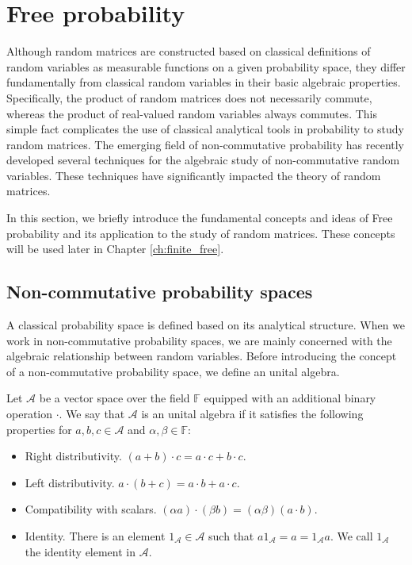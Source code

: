 \section{Free probability}

Although random matrices are constructed based on classical definitions of random variables as measurable functions on a given probability space, they differ fundamentally from classical random variables in their basic algebraic properties. Specifically, the product of random matrices does not necessarily commute, whereas the product of real-valued random variables always commutes. This simple fact complicates the use of classical analytical tools in probability to study random matrices. The emerging field of non-commutative probability has recently developed several techniques for the algebraic study of non-commutative random variables. These techniques have significantly impacted the theory of random matrices.

In this section, we briefly introduce the fundamental concepts and ideas of Free probability and its application to the study of random matrices. These concepts will be used later in Chapter \ref{ch:finite_free}.


\subsection{Non-commutative probability spaces}

A classical probability space is defined based on its analytical structure. When we work in non-commutative probability spaces, we are mainly concerned with the algebraic relationship between random variables. Before introducing the concept of a non-commutative probability space, we define an unital algebra.

\begin{definition}
    Let $\mathcal A$ be a vector space over the field $\mathbb F$ equipped with an additional binary operation $\cdot$. We say that $\mathcal A$ is an unital algebra if it satisfies the following properties for $a,b,c \in \mathcal A$ and $\alpha, \beta \in \mathbb F$:

    \begin{itemize}
        \item Right distributivity. $(a + b) \cdot c = a\cdot c + b \cdot c$.
        \item Left distributivity. $a\cdot(b + c) = a\cdot b + a \cdot c$.
        \item Compatibility with scalars. $(\alpha a)\cdot(\beta b) = (\alpha \beta)(a\cdot b)$.
        \item Identity. There is an element $1_{\mathcal A}\in \mathcal A$ such that $a 1_{\mathcal A} = a = 1_{\mathcal A} a$. We call $1_{\mathcal A}$ the identity element in $\mathcal A$.
    \end{itemize}

\end{definition}

